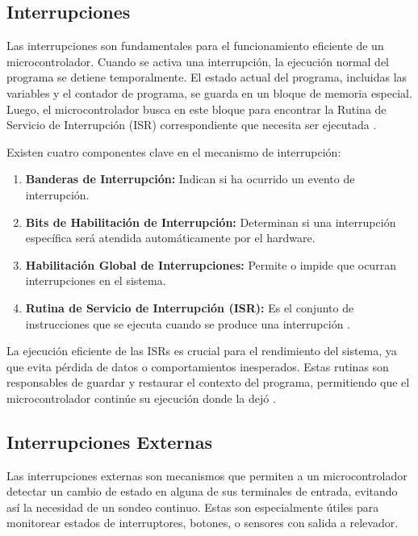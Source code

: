 \subsection{Interrupciones}

Las interrupciones son fundamentales para el funcionamiento eficiente de un microcontrolador. Cuando se activa una interrupción, la ejecución normal del programa se detiene temporalmente. El estado actual del programa, incluidas las variables y el contador de programa, se guarda en un bloque de memoria especial. Luego, el microcontrolador busca en este bloque para encontrar la Rutina de Servicio de Interrupción (ISR) correspondiente que necesita ser ejecutada \cite{Alley2011}.

Existen cuatro componentes clave en el mecanismo de interrupción:

\begin{enumerate}
  \item \textbf{Banderas de Interrupción:} Indican si ha ocurrido un evento de interrupción.
  \item \textbf{Bits de Habilitación de Interrupción:} Determinan si una interrupción específica será atendida automáticamente por el hardware.
  \item \textbf{Habilitación Global de Interrupciones:} Permite o impide que ocurran interrupciones en el sistema.
  \item \textbf{Rutina de Servicio de Interrupción (ISR):} Es el conjunto de instrucciones que se ejecuta cuando se produce una interrupción \cite{Alley2011}.
\end{enumerate}

La ejecución eficiente de las ISRs es crucial para el rendimiento del sistema, ya que evita pérdida de datos o comportamientos inesperados. Estas rutinas son responsables de guardar y restaurar el contexto del programa, permitiendo que el microcontrolador continúe su ejecución donde la dejó \cite{Alley2011}.


\subsection{Interrupciones Externas}
Las interrupciones externas son mecanismos que permiten a un microcontrolador detectar un cambio de estado en alguna de sus terminales de entrada, evitando así la necesidad de un sondeo continuo. Estas son especialmente útiles para monitorear estados de interruptores, botones, o sensores con salida a relevador. \cite{interrupciones}


